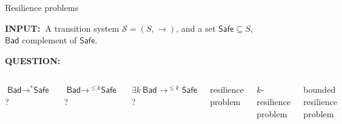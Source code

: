 \documentclass{beamer}
\newcommand{\Bad}{\textsf{Bad}}
\newcommand{\Safe}{\textsf{Safe}}
\begin{document}
  \begin{frame}{Resilience problems}
  



  

\hspace{-0.5cm}  {\bf INPUT:\ }{A transition system $\mathscr{S}=(S,\rightarrow)$, and a set $\Safe \subseteq S$, \\ $\Bad$ complement of $\Safe$.}

\hspace{-0.5cm}  {\bf QUESTION:\ } 

\begin{columns}[T]

  $\Bad \rightarrow^{*} \Safe$  ?

\vspace{0.15cm}

   $\Bad \rightarrow^{\leq k} \Safe$  ?

\vspace{0.15cm}

  $\exists k ~ \Bad \rightarrow^{\leq k} \Safe$   ?\newline

 
\hspace{0.6cm} {\sc  \phantom{bounded} resilience problem}

\vspace{0.16cm}

\hspace{0.6cm} {\sc \phantom{boundi} $k$-resilience problem}

\vspace{0.175cm}

\hspace{0.6cm} {\sc bounded resilience problem}

\end{columns}

  \end{frame}
\end{document}
